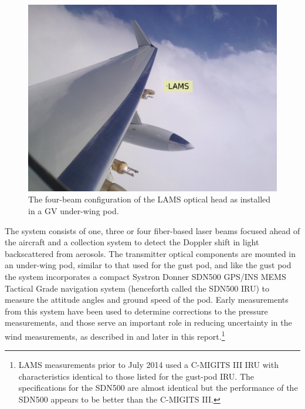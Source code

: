 \documentclass[12pt,twoside,english]{article}\usepackage[]{graphicx}\usepackage[]{color}
\let\OrgIndex\index
\renewcommand*{\index}[1]{\OrgIndex{#1}}
\begin{document}
{{\begin{figure}
\begin{centering}
\includegraphics[width=0.4\columnwidth]{SpecialGraphics/LAMS-2r}%
\caption{The four-beam configuration of the LAMS optical head as installed in a GV under-wing pod.}%
\label{fig:LAMS-4Beam}%
\end{centering}%
\end{figure}%
The system consists of one, three or four fiber-based laser beams focused ahead of the aircraft and a collection system to detect the Doppler shift in light backscattered from aerosols. The transmitter optical components are mounted in an under-wing pod, similar to that used for the gust pod, and like the gust pod the system incorporates a compact Systron Donner SDN500 GPS/INS MEMS Tactical Grade navigation system (henceforth called the SDN500 IRU) to measure the attitude angles and ground speed of the pod. Early measurements from this system have been used to determine corrections to the pressure measurements, and those serve an important role in reducing uncertainty in the wind measurements, as described in \citet{CooperEtAl2014} and later in this report.\footnote{LAMS measurements prior to July 2014 used a C-MIGITS III IRU with characteristics identical to those listed for the gust-pod IRU. The specifications for the SDN500 are almost
identical but the performance of the SDN500 appears to be better than the C-MIGITS III.} 

}}
\end{document}
